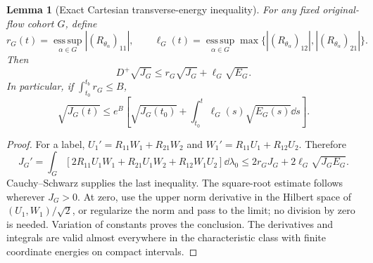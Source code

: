 \documentclass[11pt]{article}
\newtheorem{lemma}[theorem]{Lemma}\newtheorem{corollary}[theorem]{Corollary}
\theoremstyle{remark}\newtheorem{remark}[theorem]{Remark}
\begin{document}
\begin{lemma}[Exact Cartesian transverse-energy inequality]
\label{inc:AN03:bulkclock:v1:transverse}
For any fixed original-flow cohort $G$, define
\[
 r_G(t)=\operatorname*{ess\,sup}_{\alpha\in G}|(R_{\theta_\alpha})_{11}|,\qquad
 \ell_G(t)=\operatorname*{ess\,sup}_{\alpha\in G}
       \max\{|(R_{\theta_\alpha})_{12}|,|(R_{\theta_\alpha})_{21}|\}.
\]
Then
\begin{equation}\label{inc:AN03:bulkclock:v1:jineq}
 D^+\sqrt{J_G}\le r_G\sqrt{J_G}+\ell_G\sqrt{E_G}.
\end{equation}
In particular, if $\int_{t_0}^{t_b}r_G\le B$,
\[
 \sqrt{J_G(t)}\le e^B\left[\sqrt{J_G(t_0)}+
       \int_{t_0}^t\ell_G(s)\sqrt{E_G(s)}\dd s\right].
\]
\end{lemma}
\begin{proof}
For a label, $U_1'=R_{11}W_1+R_{21}W_2$ and $W_1'=R_{11}U_1+R_{12}U_2$. Therefore
\[
 J_G'=\int_G[2R_{11}U_1W_1+R_{21}U_1W_2+R_{12}W_1U_2]\dd\lambda_0
 \le2r_GJ_G+2\ell_G\sqrt{J_GE_G}.
\]
Cauchy--Schwarz supplies the last inequality. The square-root estimate follows wherever $J_G>0$. At zero, use the upper norm derivative in the Hilbert space of $(U_1,W_1)/\sqrt2$, or regularize the norm and pass to the limit; no division by zero is needed. Variation of constants proves the conclusion. The derivatives and integrals are valid almost everywhere in the characteristic class with finite coordinate energies on compact intervals.
\end{proof}
\end{document}
